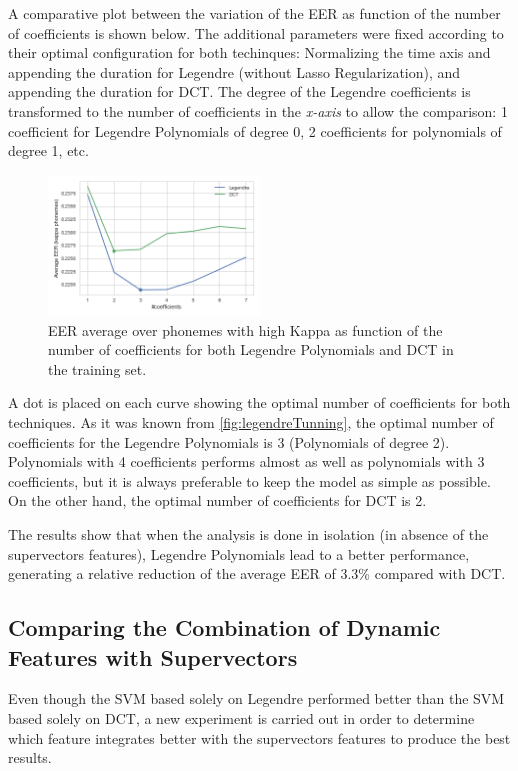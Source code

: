 A comparative plot between the variation of the EER as function of the number of coefficients
is shown below. The additional parameters were fixed according to their optimal configuration
for both techinques:
Normalizing the time axis and appending the duration for Legendre (without Lasso Regularization),
and appending the duration for DCT. The degree of the Legendre coefficients is transformed to
the number of coefficients in the \textit{x-axis} to allow the comparison: 1 coefficient for
Legendre Polynomials of degree 0, 2 coefficients for polynomials of degree 1, etc.

\begin{figure}[H]
	\centering
	\includegraphics[width=0.5\textwidth]{files/figures/results/legendre-dct/legendre-dct-coefficients.png}
	\caption{EER average over phonemes with high Kappa as function of the number of coefficients
	for both Legendre Polynomials and DCT in the training set.}
	\label{fig:legendreVsDCT}
\end{figure}

A dot is placed on each curve showing the optimal number of coefficients for both techniques.
As it was known from \ref{fig:legendreTunning}, the optimal number of coefficients for the
Legendre Polynomials is 3 (Polynomials of degree 2). Polynomials with 4 coefficients performs
almost as well as polynomials with 3 coefficients, but it is always preferable to keep the
model as simple as possible. On the other hand, the optimal number of coefficients for DCT is 2.

The results show that when the analysis is done in isolation (in absence of the supervectors
features), Legendre Polynomials lead to a better performance, generating a relative reduction
of the average EER of 3.3\% compared with DCT.

\subsection{Comparing the Combination of Dynamic Features with Supervectors}

Even though the SVM based solely on Legendre performed better than the SVM based solely on
DCT, a new experiment is carried out in order to determine which feature integrates better
with the supervectors features to produce the best results.

